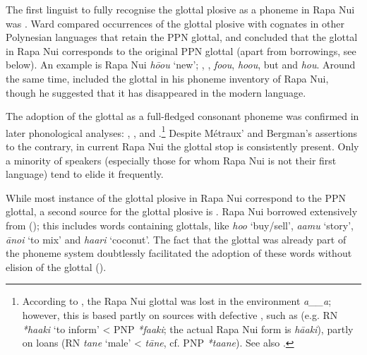 The first linguist to fully recognise the glottal plosive as a phoneme in Rapa Nui was \citet{Ward1961,Ward1964}. Ward compared occurrences of the glottal plosive with cognates in other Polynesian languages that retain the PPN glottal, and concluded that the glottal in Rapa Nui corresponds to the original PPN glottal (apart from  borrowings, see below). An example is Rapa Nui \textit{hō{\ꞌ}ou} ‘new’; , ,  \textit{\mbox{fo{\ꞌ}ou}},  \textit{ho{\ꞌ}ou}, but  and  \textit{hou}. Around the same time, \citet[4]{Bergmann1963} included the glottal in his phoneme inventory of Rapa Nui, though he suggested that it has disappeared in the modern language.

The adoption of the glottal as a full-fledged consonant phoneme was confirmed in later phonological analyses: \citet{Blixen1972}, \citet{Salas1973}, \citet{WeberWeber1982} and \citet{GuerraEissmann1993}.\footnote{\label{fn:35}According to \citet[24, 69]{Marck2000}, the Rapa Nui glottal was lost in the environment \textit{a\_\_a}; however, this is based partly on sources with defective , such as \citet{Fuentes1960} (e.g. RN \textit{*haaki} ‘to inform’ {\textless} PNP \textit{*fa{\ꞌ}aki}; the actual Rapa Nui form is \textit{hā{\ꞌ}aki}), partly on  loans (RN \textit{tane} ‘male’ {\textless}  \textit{tāne}, cf. PNP \textit{*ta{\ꞌ}ane}). See also \citet{Davletshin2015}.} Despite Métraux’ and Bergman’s assertions to the contrary, in current Rapa Nui the glottal stop is consistently present. Only a minority of speakers (especially those for whom Rapa Nui is not their first language) tend to elide it frequently. 

While most instance of the glottal plosive in Rapa Nui correspond to the PPN glottal, a second source for the glottal plosive is . Rapa Nui borrowed extensively from  (); this includes words containing glottals, like \textit{ho{\ꞌ}o} ‘buy/sell’, \textit{{\ꞌ}a{\ꞌ}amu} ‘story’, \textit{{\ꞌ}āno{\ꞌ}i} ‘to mix’ and \textit{ha{\ꞌ}ari} ‘coconut’. The fact that the glottal was already part of the phoneme system doubtlessly facilitated the adoption of these words without elision of the glottal ().

